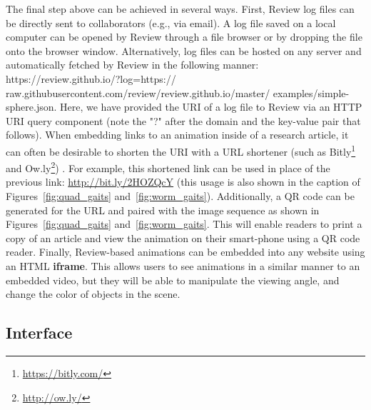 The final step above can be achieved in several ways. First, Review log files can be directly sent to collaborators (e.g., via email). A log file saved on a local computer can be opened by Review through a file browser or by dropping the file onto the browser window.
%
Alternatively, log files can be hosted on any server and automatically fetched by Review in the following manner: https://review.github.io/?log=https:// raw.githubusercontent.com/review/review.github.io/master/ examples/simple-sphere.json.
%
Here, we have provided the URI of a log file to Review via an HTTP URI query component (note the "?" after the domain and the key-value pair that follows).
%
When embedding links to an animation inside of a research article, it can often be desirable to shorten the URI with a URL shortener (such as Bitly\footnote{\url{https://bitly.com/}} and Ow.ly\footnote{\url{http://ow.ly/}}) .
%
For example, this shortened link can be used in place of the previous link: \url{http://bit.ly/2HOZQcY} (this usage is also shown in the caption of Figures~\ref{fig:quad_gaits} and~\ref{fig:worm_gaits}).
%
Additionally, a QR code can be generated for the URL and paired with the image sequence as shown in Figures~\ref{fig:quad_gaits} and~\ref{fig:worm_gaits}. This will enable readers to print a copy of an article and view the animation on their smart-phone using a QR code reader.
%
%
Finally, Review-based animations can be embedded into any website using an HTML \textbf{iframe}.
%
This allows users to see animations in a similar manner to an embedded video, but they will be able to manipulate the viewing angle, and change the color of objects in the scene.








\subsection{Interface}


